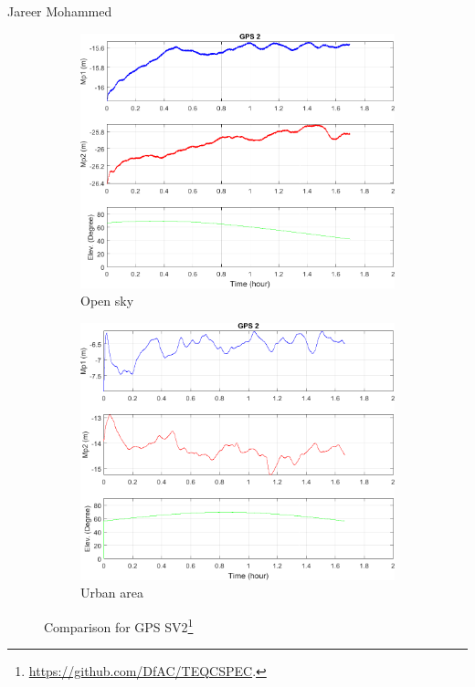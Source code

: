 \documentclass[11pt]{beamer}
\newcommand{\MatlabRef}{\footnote{\url{https://github.com/DfAC/TEQCSPEC}.}}
\begin{document}
\begin{frame}{Jareer Mohammed}%

	\begin{figure}
		\centering
		\begin{subfigure}{.5\textwidth}
			\centering
			\includegraphics[width=\textwidth]{pic/2_GS10_test_option_12.png}
			\caption{Open sky}
		\end{subfigure}%
		\begin{subfigure}{.5\textwidth}
			\centering
			\includegraphics[width=\textwidth]{pic/2_GS09_test_option_12.png}
			\caption{Urban area}
		\end{subfigure}
		\caption{Comparison for GPS SV2\MatlabRef}
	\end{figure}
\end{frame}
\end{document}
